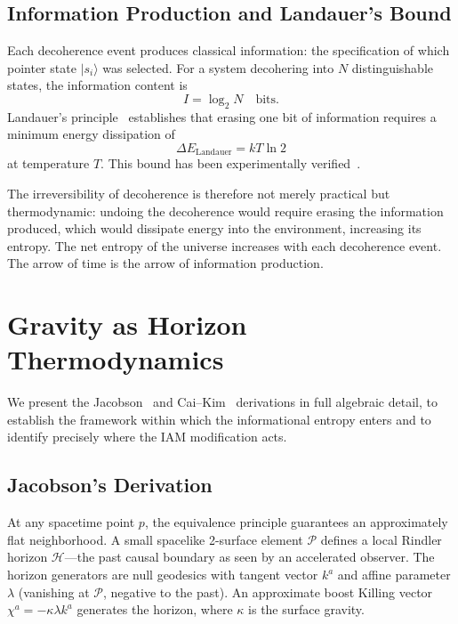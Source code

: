 \documentclass[11pt]{article}
\begin{document}
\subsection{Information Production and Landauer's Bound}

Each decoherence event produces classical information: the specification of
which pointer state $|s_i\rangle$ was selected.  For a system decohering into
$N$ distinguishable states, the information content is
\begin{equation}
I = \log_2 N \quad \text{bits}.
\label{eq:info_content}
\end{equation}
Landauer's principle~\citep{Landauer1961} establishes that erasing one bit of
information requires a minimum energy dissipation of
\begin{equation}
\Delta E_\mathrm{Landauer} = kT\ln 2
\label{eq:landauer}
\end{equation}
at temperature $T$.  This bound has been experimentally
verified~\citep{Berut2012,Jun2014}.

The irreversibility of decoherence is therefore not merely practical but
thermodynamic: undoing the decoherence would require erasing the information
produced, which would dissipate energy into the environment, increasing its
entropy.  The net entropy of the universe increases with each decoherence
event.  The arrow of time is the arrow of information production.


\section{Gravity as Horizon Thermodynamics}
\label{sec:jacobson}

We present the Jacobson~\citep{Jacobson1995} and Cai--Kim~\citep{CaiKim2005}
derivations in full algebraic detail, to establish the framework within which
the informational entropy enters and to identify precisely where the IAM
modification acts.

\subsection{Jacobson's Derivation}
\label{sec:jacobson_detail}

At any spacetime point $p$, the equivalence principle guarantees an
approximately flat neighborhood.  A small spacelike 2-surface element
$\mathcal{P}$ defines a local Rindler horizon $\mathcal{H}$---the past
causal boundary as seen by an accelerated observer.  The horizon generators
are null geodesics with tangent vector $k^a$ and affine parameter $\lambda$
(vanishing at $\mathcal{P}$, negative to the past).  An approximate boost
Killing vector $\chi^a = -\kappa\lambda k^a$ generates the horizon, where
$\kappa$ is the surface gravity.
\end{document}
